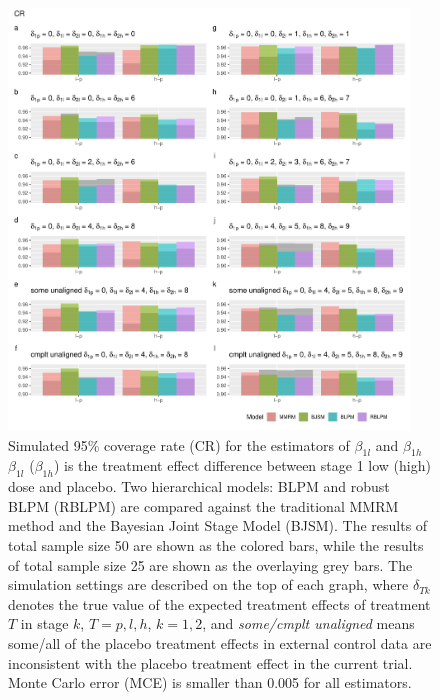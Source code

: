 \begin{figure}
\includegraphics[width=0.95\textwidth]{chapters/figures/CR_longitudinal.pdf}
\caption{Simulated 95\% coverage rate (CR) for the estimators of $\beta_{1l}$ and $\beta_{1h}$\label{fig:CR_longitudinal}\\$\beta_{1l}$ ($\beta_{1h}$) is the treatment effect difference between stage 1 low (high) dose and placebo. Two hierarchical models: BLPM and robust BLPM (RBLPM) are compared against the traditional MMRM method and the Bayesian Joint Stage Model (BJSM). The results of total sample size 50 are shown as the colored bars, while the results of total sample size 25 are shown as the overlaying grey bars. The simulation settings are described on the top of each graph, where $\delta_{Tk}$ denotes the true value of the expected treatment effects of treatment $T$ in stage $k$, $T = p, l, h$, $k = 1, 2$, and \emph{some/cmplt unaligned} means some/all of the placebo treatment effects in external control data are inconsistent with the placebo treatment effect in the current trial. Monte Carlo error (MCE) is smaller than 0.005 for all estimators.}
\end{figure}


